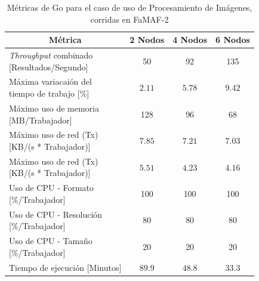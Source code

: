 \documentclass[11pt]{article}
\providecommand{\row}[1]{\parbox{150pt}{\setlength{\baselineskip}{0.2\baselineskip}\strut#1\strut}}
\newcommand{\ipcap}[2]{\caption{Métricas de #1 para el caso de uso de Procesamiento de Imágenes, corridas en #2}}
\newcommand{\english}[1]{\textit{#1}}
\begin{document}
\begin{table}[H]
\centering
\begin{tabular}{|l|c|c|c|}
\hline
\multicolumn{1}{|c|}{Métrica} & 2 Nodos & 4 Nodos & 6 Nodos \\ \hline
\row{\english{Throughput} combinado\\{[Resultados/Segundo]}} & 50 & 92 & 135 \\ \hline
\row{Máxima variacaión del \\ tiempo de trabajo {[}\%{]}} & $2.11$ & $5.78$ & $9.42$ \\ \hline
\row{Máximo uso de memoria \\ {[MB/Trabajador]}} & 128 & 96 & 68 \\ \hline
\row{Máximo uso de red (Tx) \\ {[KB/(s * Trabajador)]}} & $7.85$ & $7.21$ & $7.03$ \\ \hline
\row{Máximo uso de red (Tx) \\ {[KB/(s * Trabajador)]}} & $5.51$ & $4.23$ & $4.16$ \\ \hline
\row{Uso de CPU - Formato\\{[\%/Trabajador]}} & 100 & 100 & 100 \\ \hline
\row{Uso de CPU - Resolución\\{[\%/Trabajador]}} & 80 & 80 & 80 \\ \hline
\row{Uso de CPU - Tamaño\\{[\%/Trabajador]}} & 20 & 20 & 20 \\ \hline
Tiempo de ejecución [Minutos] & $89.9$ & $48.8$ & $33.3$ \\ \hline
\end{tabular}
\ipcap{Go}{FaMAF-2}
\end{table}
\end{document}
